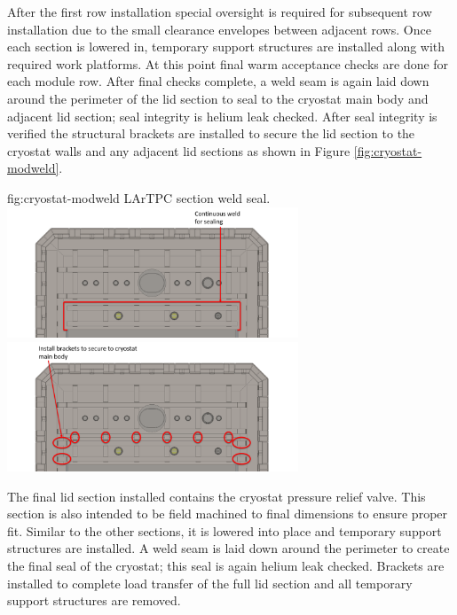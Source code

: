 After the first row installation special oversight is required for subsequent row installation due to the small clearance envelopes between adjacent rows.  Once each section is lowered in, temporary support structures are installed along with required work platforms. At this point final warm acceptance checks are done for each module row.  After final checks complete, a weld seam is again laid down around the perimeter of the lid section to seal to the cryostat main body and adjacent lid section; seal integrity is helium leak checked.  After seal integrity is verified the structural brackets are installed to secure the lid section to the cryostat walls and any adjacent lid sections as shown in Figure \ref{fig:cryostat-modweld}.

\begin{dunefigure}{fig:cryostat-modweld}
{LArTPC section weld seal.}
\includegraphics[width=0.65\textwidth]{graphics/cryostat/cryostat-modweld.png}
\includegraphics[width=0.65\textwidth]{graphics/cryostat/cryostat-modbrack.png}
\end{dunefigure}


The final lid section installed contains the cryostat pressure relief valve.  This section is also intended to be field machined to final dimensions to ensure proper fit.  Similar to the other sections, it is lowered into place and temporary support structures are installed.  A weld seam is laid down around the perimeter to create the final seal of the cryostat; this seal is again helium leak checked. Brackets are installed to complete load transfer of the full lid section and all temporary support structures are removed.



